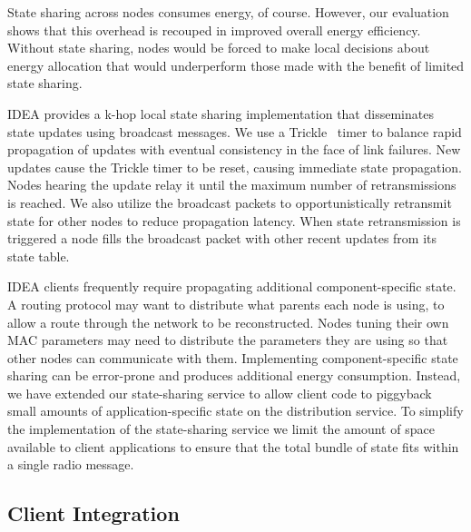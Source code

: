 State sharing across nodes consumes energy, of course. However, our
evaluation shows that this overhead is recouped in improved overall energy
efficiency. Without state sharing, nodes would be forced to make local
decisions about energy allocation that would underperform those made with the
benefit of limited state sharing.

IDEA provides a k-hop local state sharing implementation that disseminates
state updates using broadcast messages. We use a Trickle~\cite{trickle} timer
to balance rapid propagation of updates with eventual consistency in the face
of link failures. New updates cause the Trickle timer to be reset, causing
immediate state propagation. Nodes hearing the update relay it until the
maximum number of retransmissions is reached. We also utilize the broadcast
packets to opportunistically retransmit state for other nodes to reduce
propagation latency. When state retransmission is triggered a node fills the
broadcast packet with other recent updates from its state table.

IDEA clients frequently require propagating additional component-specific
state. A routing protocol may want to distribute what parents each node is
using, to allow a route through the network to be reconstructed. Nodes tuning
their own MAC parameters may need to distribute the parameters they are using
so that other nodes can communicate with them. Implementing
component-specific state sharing can be error-prone and produces additional
energy consumption.  Instead, we have extended our state-sharing service to
allow client code to piggyback small amounts of application-specific state on
the distribution service. To simplify the implementation of the state-sharing
service we limit the amount of space available to client applications to
ensure that the total bundle of state fits within a single radio message.

\subsection{Client Integration}

